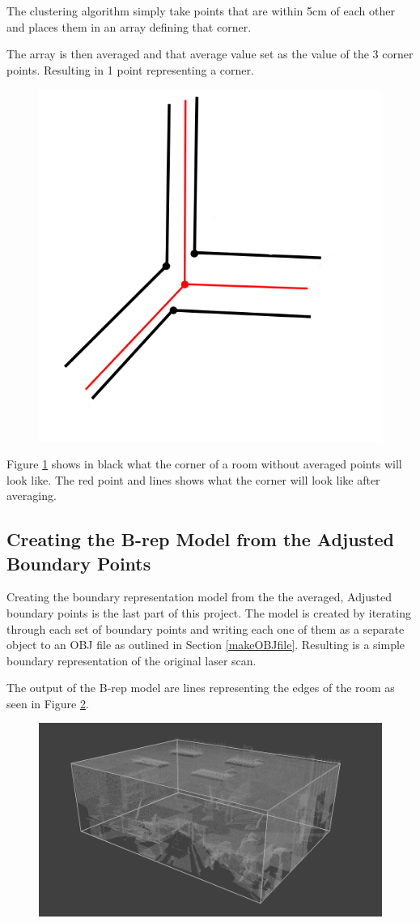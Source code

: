 			The clustering algorithm simply take points that are within 5cm of each other and places them in an array defining that corner.
			
			The array is then averaged and that average value set as the value of the 3 corner points. Resulting in 1 point representing a corner.
			
			\begin{figure}
				\centering
				\includegraphics[width=0.7\linewidth]{Includes/images/CornerAveraging}
				\caption{}
				\label{fig:CornerAveraging}
			\end{figure}
			
			Figure \ref{fig:CornerAveraging} shows in black what the corner of a room without averaged points will look like. The red point and lines shows what the corner will look like after averaging.


		\subsection{Creating the B-rep Model from the Adjusted Boundary Points}
			Creating the boundary representation model from the the averaged, Adjusted boundary points is the last part of this project. The model is created by iterating through each set of boundary points and writing each one of them as a separate object to an OBJ file as outlined in Section \ref{makeOBJfile}. Resulting is a simple boundary representation of the original laser scan.
			
			The output of the B-rep model are lines representing the edges of the room as seen in Figure \ref{fig:full2}.
			
			\begin{figure}[H]
			\centering
			\includegraphics[width=1\linewidth]{Includes/images/f/full4}
			\caption{}
			\label{fig:full2}
			\end{figure}


					
